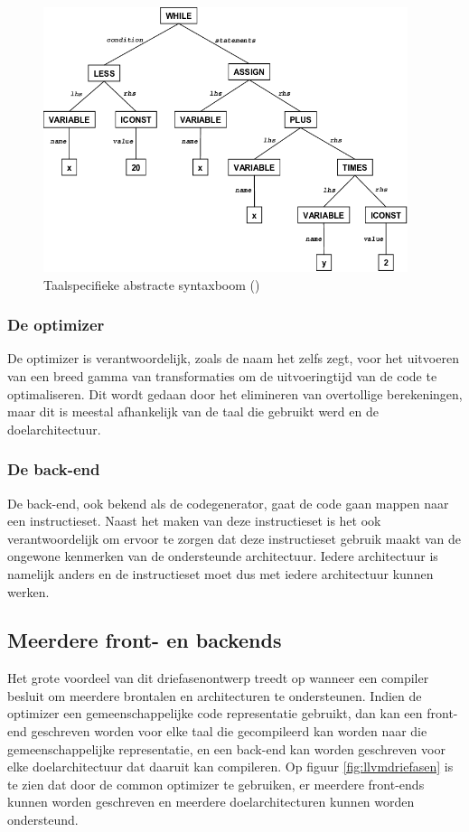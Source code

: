 \begin{figure} [ht]
	\centering
	\includegraphics[width=0.95\textwidth]{img/syntaxtree.png}
	\caption{Taalspecifieke abstracte syntaxboom (\cite{ResearchGate})}
	\label{fig:syntaxtree}
\end{figure}

\subsubsection{De optimizer}
De optimizer is verantwoordelijk, zoals de naam het zelfs zegt, voor het uitvoeren van een breed gamma van transformaties om de uitvoeringtijd van de code te optimaliseren. Dit wordt gedaan door het elimineren van overtollige berekeningen, maar dit is meestal afhankelijk van de taal die gebruikt werd en de doelarchitectuur.

\subsubsection{De back-end}
De back-end, ook bekend als de codegenerator, gaat de code gaan mappen naar een instructieset. Naast het maken van deze instructieset is het ook verantwoordelijk om ervoor te zorgen dat deze instructieset gebruik maakt van de ongewone kenmerken van de ondersteunde architectuur. Iedere architectuur is namelijk anders en de instructieset moet dus met iedere architectuur kunnen werken. 

\subsection{Meerdere front- en backends}
Het grote voordeel van dit driefasenontwerp treedt op wanneer een compiler besluit om meerdere brontalen en architecturen te ondersteunen. Indien de optimizer een gemeenschappelijke code representatie gebruikt, dan kan een front-end geschreven worden voor elke taal die gecompileerd kan worden naar die gemeenschappelijke representatie, en een back-end kan worden geschreven voor elke doelarchitectuur dat daaruit kan compileren. Op figuur \ref{fig:llvmdriefasen} is te zien dat door de common optimizer te gebruiken, er meerdere front-ends kunnen worden geschreven en meerdere doelarchitecturen kunnen worden ondersteund.

